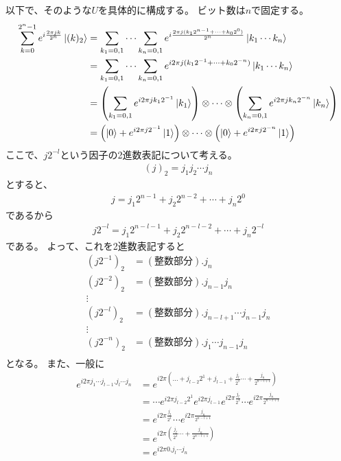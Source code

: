 \documentclass[]{ltjsarticle}
\begin{document}
以下で、そのような$U$を具体的に構成する。
ビット数は$n$で固定する。
\begin{align}
    \sum_{k=0}^{2^n-1}
    e^{i\frac{2\pi jk}{2^n}}
    \ket{(k)_2}    
    &=
    \sum_{k_1=0,1}
    \cdots 
    \sum_{k_n=0,1}
    e^{i\frac{2\pi j (k_12^{n-1} + \cdots + k_02^{0})}{2^n}}
    \ket{k_1 \cdots k_n} \\
    &=
    \sum_{k_1=0,1}
    \cdots 
    \sum_{k_n=0,1}
    e^{i 2\pi j (k_12^{-1} + \cdots + k_02^{-n})}
    \ket{k_1 \cdots k_n} \\  
    &=
    \left(
        \sum_{k_1=0,1}
        e^{i2\pi j k_1 2^{-1}}
        \ket{k_1}
    \right)
    \otimes 
    \cdots 
    \otimes 
    \left(
        \sum_{k_n=0,1}
        e^{i2\pi j k_n 2^{-n}}
        \ket{k_n}
    \right) \\
    &=
    \left(
        \ket{0} 
        + 
        e^{i2\pi j 2^{-1}} \ket{1}
    \right)
    \otimes 
    \cdots 
    \otimes 
    \left(
        \ket{0} 
        + 
        e^{i2\pi j 2^{-n}} \ket{1}
    \right)
\end{align}
ここで、$j2^{-l}$という因子の2進数表記について考える。
\begin{align}
    (j)_2 = j_1 j_2 \cdots j_n 
\end{align}
とすると、 
\begin{align}
    j = j_1 2^{n-1} + j_2 2^{n-2} + \cdots + j_n2^0
\end{align}
であるから
\begin{align}
    j2^{-l} = j_1 2^{n-l-1} + j_2 2^{n-l-2} + \cdots + j_n2^{-l}
\end{align}
である。
よって、これを2進数表記すると
\begin{align}
    (j2^{-1})_2 &= (\text{整数部分}).j_n \\
    (j2^{-2})_2 &= (\text{整数部分}).j_{n-1}j_n \\
    \vdots& \\
    (j2^{-l})_2 &= (\text{整数部分}).j_{n-l+1}\cdots j_{n-1}j_n \\
    \vdots& \\
    (j2^{-n})_2 &= (\text{整数部分}).j_{1}\cdots j_{n-1}j_n \\
\end{align}
となる。
また、一般に
\begin{align}
    e^{i 2\pi j_1 \cdots j_{l-1}. j_l \cdots j_n}
    &=
    e^{
        i 2\pi 
        \left(
            \dots
            +
            j_{l-2}2^1
            +
            j_{l-1} 
            +
            \frac{j_l}{2^1}
            \cdots
            +
            \frac{j_n}{2^{n-l+1}}       
        \right)
    } \\
    &=
    \cdots
    e^{i 2\pi j_{l-2}2^1}
    e^{i 2\pi j_{l-1}}
    e^{i 2\pi \frac{j_l}{2^1}}
    \cdots
    e^{i 2\pi \frac{j_n}{2^{n-l+1}}} \\
    &=
    e^{i 2\pi \frac{j_l}{2^1}}
    \cdots
    e^{i 2\pi \frac{j_n}{2^{n-l+1}}} \\
    &=
    e^{
        i 2\pi 
        \left(
            \frac{j_l}{2^1}
            \cdots
            +
            \frac{j_n}{2^{n-l+1}}       
        \right)
    }\\
    &=
    e^{i 2\pi 0. j_l \cdots j_n}
\end{align}
\end{document}
